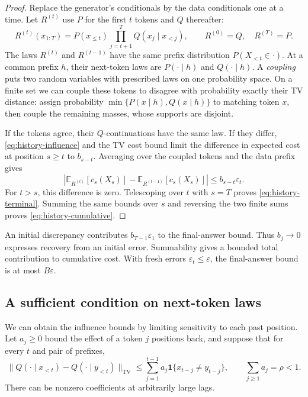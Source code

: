 \documentclass[11pt,twoside]{article}
\newcommand{\E}{\mathbb E}
\newcommand{\tv}[1]{\lVert #1\rVert_{\mathrm{TV}}}
\theoremstyle{definition}
\theoremstyle{remark}
\begin{document}
\begin{proof}
Replace the generator's conditionals by the data conditionals one at
a time. Let \(R^{(t)}\) use \(P\) for the first \(t\) tokens and \(Q\)
thereafter:
\[
 R^{(t)}(x_{1:T})
 =P(x_{\le t})\prod_{j=t+1}^T Q(x_j\mid x_{<j}),
 \qquad R^{(0)}=Q,\quad R^{(T)}=P.
\]
The laws \(R^{(t)}\) and \(R^{(t-1)}\) have the same prefix distribution
\(P(X_{<t}\in\cdot)\). At a common prefix \(h\), their next-token laws
are \(P(\cdot\mid h)\) and \(Q(\cdot\mid h)\).
A \emph{coupling} puts two random variables with prescribed laws on
one probability space. On a finite set we can couple these tokens
to disagree with probability exactly their TV distance: assign
probability \(\min\{P(x\mid h),Q(x\mid h)\}\) to matching token \(x\),
then couple the remaining masses, whose supports are disjoint.

If the tokens agree, their \(Q\)-continuations have the same law.
If they differ, \cref{eq:history-influence} and the TV cost bound
limit the difference in expected cost at position \(s\ge t\)
to \(b_{s-t}\). Averaging over the coupled tokens and the data prefix gives
\[
 \left|\E_{R^{(t)}}[c_s(X_s)]
       -\E_{R^{(t-1)}}[c_s(X_s)]\right|
 \le b_{s-t}\varepsilon_t.
\]
For \(t>s\), this difference is zero.
Telescoping over \(t\) with \(s=T\) proves
\cref{eq:history-terminal}. Summing the same bounds over \(s\) and
reversing the two finite sums proves \cref{eq:history-cumulative}.
\end{proof}

An initial discrepancy contributes \(b_{T-1}\varepsilon_1\) to
the final-answer bound. Thus \(b_j\to0\) expresses recovery from
an initial error. Summability gives a bounded total contribution
to cumulative cost. With fresh errors \(\varepsilon_t\le\varepsilon\),
the final-answer bound is at most \(B\varepsilon\).

\subsection{A sufficient condition on next-token laws}

We can obtain the influence bounds by limiting sensitivity to each
past position. Let \(a_j\ge0\) bound the effect of a token \(j\) positions
back, and suppose that for every \(t\) and pair of prefixes,
\begin{equation}
 \tv{Q(\cdot\mid x_{<t})-Q(\cdot\mid y_{<t})}
 \le\sum_{j=1}^{t-1}a_j\mathbf 1\{x_{t-j}\ne y_{t-j}\},
 \qquad \sum_{j\ge1}a_j=\rho<1.
 \label{eq:history-sensitivity}
\end{equation}
There can be nonzero coefficients at arbitrarily large lags.
\end{document}
